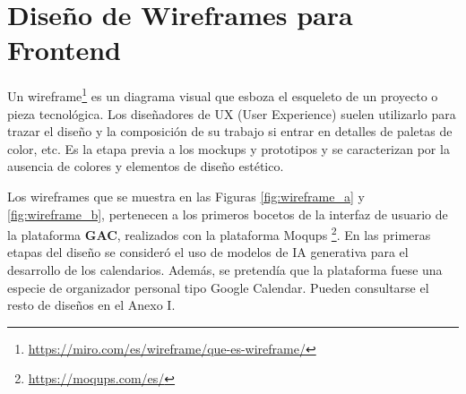 \section{Diseño de Wireframes para Frontend}

Un wireframe\footnote{\url{https://miro.com/es/wireframe/que-es-wireframe/}} es un diagrama visual que esboza el esqueleto de un proyecto o pieza tecnológica. Los diseñadores de UX (User Experience) suelen utilizarlo para trazar el diseño y la composición de su trabajo si entrar en detalles de paletas de color, etc. Es la etapa previa a los mockups y prototipos y se caracterizan por la ausencia de colores y elementos de diseño estético.\newline

Los wireframes que se muestra en las Figuras \ref{fig:wireframe_a} y \ref{fig:wireframe_b}, pertenecen a los primeros bocetos de la interfaz de usuario de la plataforma \textbf{GAC}, realizados con la plataforma Moqups \footnote{\url{https://moqups.com/es/}}. En las primeras etapas del diseño se consideró el uso de modelos de IA generativa para el desarrollo de los calendarios. Además, se pretendía que la plataforma fuese una especie de organizador personal tipo Google Calendar. Pueden consultarse el resto de diseños en el Anexo I.\newline


